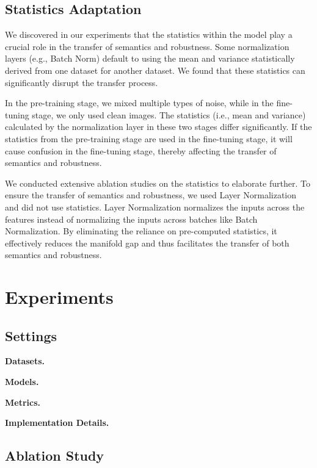 \subsection{Statistics Adaptation}

We discovered in our experiments that the statistics within the model play a crucial role in the transfer of semantics and robustness. Some normalization layers (e.g., Batch Norm) default to using the mean and variance statistically derived from one dataset for another dataset. We found that these statistics can significantly disrupt the transfer process.

In the pre-training stage, we mixed multiple types of noise, while in the fine-tuning stage, we only used clean images. The statistics (i.e., mean and variance) calculated by the normalization layer in these two stages differ significantly. If the statistics from the pre-training stage are used in the fine-tuning stage, it will cause confusion in the fine-tuning stage, thereby affecting the transfer of semantics and robustness.

We conducted extensive ablation studies on the statistics to elaborate further. To ensure the transfer of semantics and robustness, we used Layer Normalization and did not use statistics. Layer Normalization normalizes the inputs across the features instead of normalizing the inputs across batches like Batch Normalization. By eliminating the reliance on pre-computed statistics, it effectively reduces the manifold gap and thus facilitates the transfer of both semantics and robustness.


\newpage


\section{Experiments}
\label{sec:experiments}


\subsection{Settings}

\textbf{Datasets.}

\textbf{Models.}

\textbf{Metrics.}

\textbf{Implementation Details.}


\subsection{Ablation Study}

